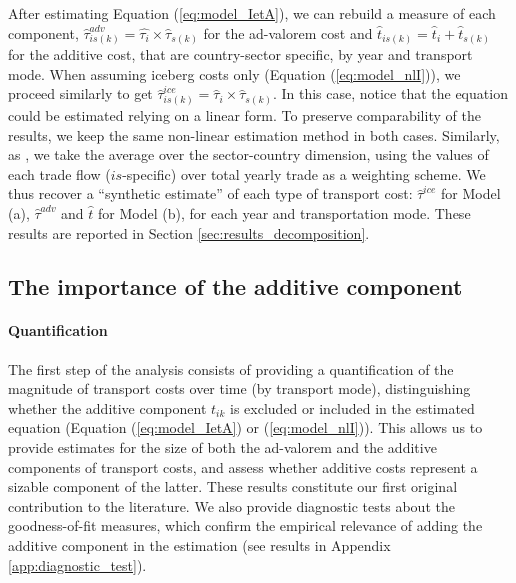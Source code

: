 \documentclass[a4paper,11pt]{article}
\begin{document}


After estimating Equation (\ref{eq:model_IetA}), we can rebuild a measure of each component, $\widehat{\tau}^{adv}_{is(k)} = \widehat{\tau_{i}} \times \widehat{\tau}_{s(k)}$ for the ad-valorem cost and $\widehat{t}_{is(k)} = \widehat{t}_{i} + \widehat{t}_{s(k)}$ for the additive cost, that are country-sector specific, by year and transport mode.
When assuming iceberg costs only (Equation (\ref{eq:model_nlI})), we proceed similarly to get $\widehat{\tau}^{ice}_{is(k)} = \widehat{\tau}_{i} \times \widehat{\tau}_{s(k)}$.
In this case, notice that the equation could be estimated relying on a linear form.
To preserve comparability of the results, we keep the same non-linear estimation method in both cases.
Similarly, as \cite{Irrazabal_2015}, we take the average over the sector-country dimension, using the values of each trade flow ($is$-specific) over total yearly trade as a weighting scheme.
We thus recover a ``synthetic estimate'' of each type of transport cost: $\widehat{\tau}^{ice}$ for Model (a), $\widehat{\tau}^{adv}$ and $\widehat{t}$ for Model (b), for each year and transportation mode.
These results are reported in Section \ref{sec:results_decomposition}.


\subsection{The importance of the additive component \label{sec:results_decomposition}}

\paragraph{Quantification} The first step of the analysis consists of providing a quantification of the magnitude of transport costs over time (by transport mode), distinguishing whether the additive component $t_{ik}$ is excluded or included in the estimated equation (Equation (\ref{eq:model_IetA}) or (\ref{eq:model_nlI})).
This allows us to provide estimates for the size of both the ad-valorem and the additive components of transport costs, and assess whether additive costs represent a sizable component of the latter.
These results constitute our first original contribution to the literature.
We also provide diagnostic tests about the goodness-of-fit measures, which confirm the empirical relevance of adding the additive component in the estimation (see results in Appendix \ref{app:diagnostic_test}).\smallskip
\end{document}
